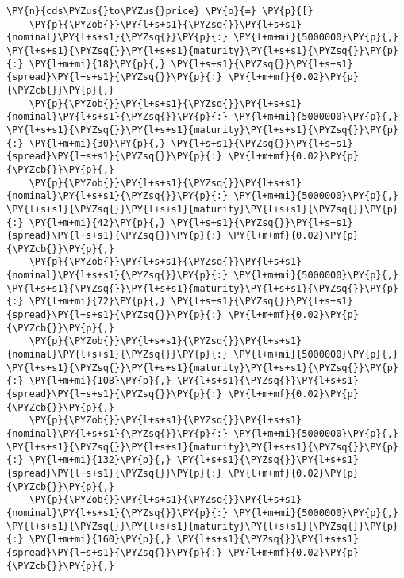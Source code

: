 \begin{Answer}
\begin{tcolorbox}[size=fbox, boxrule=1pt, pad at break*=1mm,colback=cellbackground, colframe=cellborder]
\begin{Verbatim}[commandchars=\\\{\}]
\PY{n}{cds\PYZus{}to\PYZus{}price} \PY{o}{=} \PY{p}{[}
    \PY{p}{\PYZob{}}\PY{l+s+s1}{\PYZsq{}}\PY{l+s+s1}{nominal}\PY{l+s+s1}{\PYZsq{}}\PY{p}{:} \PY{l+m+mi}{5000000}\PY{p}{,} \PY{l+s+s1}{\PYZsq{}}\PY{l+s+s1}{maturity}\PY{l+s+s1}{\PYZsq{}}\PY{p}{:} \PY{l+m+mi}{18}\PY{p}{,} \PY{l+s+s1}{\PYZsq{}}\PY{l+s+s1}{spread}\PY{l+s+s1}{\PYZsq{}}\PY{p}{:} \PY{l+m+mf}{0.02}\PY{p}{\PYZcb{}}\PY{p}{,}
    \PY{p}{\PYZob{}}\PY{l+s+s1}{\PYZsq{}}\PY{l+s+s1}{nominal}\PY{l+s+s1}{\PYZsq{}}\PY{p}{:} \PY{l+m+mi}{5000000}\PY{p}{,} \PY{l+s+s1}{\PYZsq{}}\PY{l+s+s1}{maturity}\PY{l+s+s1}{\PYZsq{}}\PY{p}{:} \PY{l+m+mi}{30}\PY{p}{,} \PY{l+s+s1}{\PYZsq{}}\PY{l+s+s1}{spread}\PY{l+s+s1}{\PYZsq{}}\PY{p}{:} \PY{l+m+mf}{0.02}\PY{p}{\PYZcb{}}\PY{p}{,}
    \PY{p}{\PYZob{}}\PY{l+s+s1}{\PYZsq{}}\PY{l+s+s1}{nominal}\PY{l+s+s1}{\PYZsq{}}\PY{p}{:} \PY{l+m+mi}{5000000}\PY{p}{,} \PY{l+s+s1}{\PYZsq{}}\PY{l+s+s1}{maturity}\PY{l+s+s1}{\PYZsq{}}\PY{p}{:} \PY{l+m+mi}{42}\PY{p}{,} \PY{l+s+s1}{\PYZsq{}}\PY{l+s+s1}{spread}\PY{l+s+s1}{\PYZsq{}}\PY{p}{:} \PY{l+m+mf}{0.02}\PY{p}{\PYZcb{}}\PY{p}{,}
    \PY{p}{\PYZob{}}\PY{l+s+s1}{\PYZsq{}}\PY{l+s+s1}{nominal}\PY{l+s+s1}{\PYZsq{}}\PY{p}{:} \PY{l+m+mi}{5000000}\PY{p}{,} \PY{l+s+s1}{\PYZsq{}}\PY{l+s+s1}{maturity}\PY{l+s+s1}{\PYZsq{}}\PY{p}{:} \PY{l+m+mi}{72}\PY{p}{,} \PY{l+s+s1}{\PYZsq{}}\PY{l+s+s1}{spread}\PY{l+s+s1}{\PYZsq{}}\PY{p}{:} \PY{l+m+mf}{0.02}\PY{p}{\PYZcb{}}\PY{p}{,}
    \PY{p}{\PYZob{}}\PY{l+s+s1}{\PYZsq{}}\PY{l+s+s1}{nominal}\PY{l+s+s1}{\PYZsq{}}\PY{p}{:} \PY{l+m+mi}{5000000}\PY{p}{,} \PY{l+s+s1}{\PYZsq{}}\PY{l+s+s1}{maturity}\PY{l+s+s1}{\PYZsq{}}\PY{p}{:} \PY{l+m+mi}{108}\PY{p}{,} \PY{l+s+s1}{\PYZsq{}}\PY{l+s+s1}{spread}\PY{l+s+s1}{\PYZsq{}}\PY{p}{:} \PY{l+m+mf}{0.02}\PY{p}{\PYZcb{}}\PY{p}{,}
    \PY{p}{\PYZob{}}\PY{l+s+s1}{\PYZsq{}}\PY{l+s+s1}{nominal}\PY{l+s+s1}{\PYZsq{}}\PY{p}{:} \PY{l+m+mi}{5000000}\PY{p}{,} \PY{l+s+s1}{\PYZsq{}}\PY{l+s+s1}{maturity}\PY{l+s+s1}{\PYZsq{}}\PY{p}{:} \PY{l+m+mi}{132}\PY{p}{,} \PY{l+s+s1}{\PYZsq{}}\PY{l+s+s1}{spread}\PY{l+s+s1}{\PYZsq{}}\PY{p}{:} \PY{l+m+mf}{0.02}\PY{p}{\PYZcb{}}\PY{p}{,}
    \PY{p}{\PYZob{}}\PY{l+s+s1}{\PYZsq{}}\PY{l+s+s1}{nominal}\PY{l+s+s1}{\PYZsq{}}\PY{p}{:} \PY{l+m+mi}{5000000}\PY{p}{,} \PY{l+s+s1}{\PYZsq{}}\PY{l+s+s1}{maturity}\PY{l+s+s1}{\PYZsq{}}\PY{p}{:} \PY{l+m+mi}{160}\PY{p}{,} \PY{l+s+s1}{\PYZsq{}}\PY{l+s+s1}{spread}\PY{l+s+s1}{\PYZsq{}}\PY{p}{:} \PY{l+m+mf}{0.02}\PY{p}{\PYZcb{}}\PY{p}{,}

\end{Verbatim}
\end{tcolorbox}
\end{Answer}
